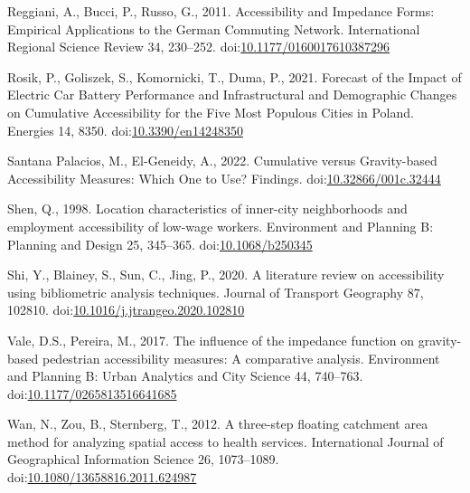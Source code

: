 \documentclass[]{elsarticle} %
\newlength{\cslhangindent}
\newlength{\cslentryspacingunit} %
\newenvironment{CSLReferences}[2] %
 {%
  \setlength{\parindent}{0pt}
  \ifodd #1
  \let\oldpar\par
  \def\par{\hangindent=\cslhangindent\oldpar}
  \fi
  \setlength{\parskip}{#2\cslentryspacingunit}
 }%
 {}
\begin{document}
\begin{CSLReferences}{1}{0}
\leavevmode{}%
Reggiani, A., Bucci, P., Russo, G., 2011. Accessibility and {Impedance}
{Forms}: {Empirical} {Applications} to the {German} {Commuting}
{Network}. International Regional Science Review 34, 230--252.
doi:\href{https://doi.org/10.1177/0160017610387296}{10.1177/0160017610387296}

\leavevmode{}%
Rosik, P., Goliszek, S., Komornicki, T., Duma, P., 2021. Forecast of the
{Impact} of {Electric} {Car} {Battery} {Performance} and
{Infrastructural} and {Demographic} {Changes} on {Cumulative}
{Accessibility} for the {Five} {Most} {Populous} {Cities} in {Poland}.
Energies 14, 8350.
doi:\href{https://doi.org/10.3390/en14248350}{10.3390/en14248350}

\leavevmode{}%
Santana Palacios, M., El-Geneidy, A., 2022. Cumulative versus
Gravity-based Accessibility Measures: Which One to Use? Findings.
doi:\href{https://doi.org/10.32866/001c.32444}{10.32866/001c.32444}

\leavevmode{}%
Shen, Q., 1998. Location characteristics of inner-city neighborhoods and
employment accessibility of low-wage workers. Environment and Planning
B: Planning and Design 25, 345--365.
doi:\href{https://doi.org/10.1068/b250345}{10.1068/b250345}

\leavevmode{}%
Shi, Y., Blainey, S., Sun, C., Jing, P., 2020. A literature review on
accessibility using bibliometric analysis techniques. Journal of
Transport Geography 87, 102810.
doi:\href{https://doi.org/10.1016/j.jtrangeo.2020.102810}{10.1016/j.jtrangeo.2020.102810}

\leavevmode{}%
Vale, D.S., Pereira, M., 2017. The influence of the impedance function
on gravity-based pedestrian accessibility measures: {A} comparative
analysis. Environment and Planning B: Urban Analytics and City Science
44, 740--763.
doi:\href{https://doi.org/10.1177/0265813516641685}{10.1177/0265813516641685}

\leavevmode{}%
Wan, N., Zou, B., Sternberg, T., 2012. A three-step floating catchment
area method for analyzing spatial access to health services.
International Journal of Geographical Information Science 26,
1073--1089.
doi:\href{https://doi.org/10.1080/13658816.2011.624987}{10.1080/13658816.2011.624987}


\end{CSLReferences}
\end{document}
